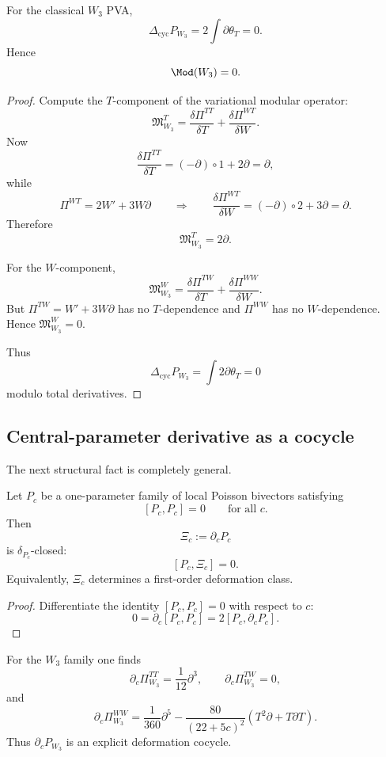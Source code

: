 \begin{theorem}\label{thm:W3mod0}
For the classical $W_3$ PVA,
\[
\Delta_{\mathrm{cyc}}P_{W_3}=2\int \partial\theta_T=0.
\]
Hence
\[
\Mod(W_3)=0.
\]
\end{theorem}

\begin{proof}
Compute the $T$-component of the variational modular operator:
\[
\mathfrak M_{W_3}^T
=
\frac{\delta \Pi^{TT}}{\delta T}
+
\frac{\delta \Pi^{WT}}{\delta W}.
\]
Now
\[
\frac{\delta \Pi^{TT}}{\delta T}=(-\partial)\circ 1+2\partial=\partial,
\]
while
\[
\Pi^{WT}=2W'+3W\partial
\qquad\Longrightarrow\qquad
\frac{\delta \Pi^{WT}}{\delta W}=(-\partial)\circ 2 + 3\partial=\partial.
\]
Therefore
\[
\mathfrak M_{W_3}^T=2\partial.
\]

For the $W$-component,
\[
\mathfrak M_{W_3}^W
=
\frac{\delta \Pi^{TW}}{\delta T}
+
\frac{\delta \Pi^{WW}}{\delta W}.
\]
But $\Pi^{TW}=W'+3W\partial$ has no $T$-dependence and $\Pi^{WW}$ has no $W$-dependence.
Hence $\mathfrak M_{W_3}^W=0$.

Thus
\[
\Delta_{\mathrm{cyc}}P_{W_3}=\int 2\partial\theta_T=0
\]
modulo total derivatives.
\end{proof}

\subsection{Central-parameter derivative as a cocycle}

The next structural fact is completely general.

\begin{theorem}\label{thm:parameter-cocycle}
Let $P_c$ be a one-parameter family of local Poisson bivectors satisfying
\[
[P_c,P_c]=0
\qquad\text{for all }c.
\]
Then
\[
\Xi_c:=\partial_c P_c
\]
is $\delta_{P_c}$-closed:
\[
[P_c,\Xi_c]=0.
\]
Equivalently, $\Xi_c$ determines a first-order deformation class.
\end{theorem}

\begin{proof}
Differentiate the identity $[P_c,P_c]=0$ with respect to $c$:
\[
0=\partial_c[P_c,P_c]=2[P_c,\partial_cP_c].
\]
\end{proof}

For the $W_3$ family one finds
\[
\partial_c \Pi^{TT}_{W_3}=\frac1{12}\partial^3,\qquad
\partial_c\Pi^{TW}_{W_3}=0,
\]
and
\[
\partial_c \Pi^{WW}_{W_3}
=
\frac1{360}\partial^5-\frac{80}{(22+5c)^2}(T^2\partial+T\partial T).
\]
Thus $\partial_c P_{W_3}$ is an explicit deformation cocycle.

